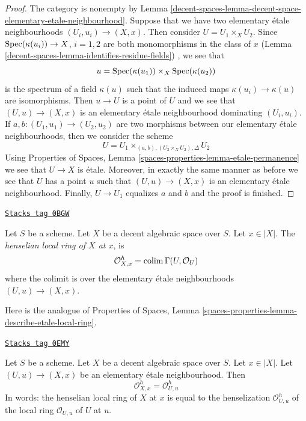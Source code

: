 \begin{proof}
The category is nonempty by
Lemma \ref{decent-spaces-lemma-decent-space-elementary-etale-neighbourhood}.
Suppose that we have two elementary \'etale neighbourhoods
$(U_i, u_i) \to (X, x)$.
Then consider $U = U_1 \times_X U_2$. Since
$\operatorname{Spec}(\kappa(u_i)) \to X$, $i = 1, 2$ are both monomorphisms
in the class of $x$ (Lemma \ref{decent-spaces-lemma-identifies-residue-fields})
, we see that
$$
u = \operatorname{Spec}(\kappa(u_1)) \times_X \operatorname{Spec}(\kappa(u_2))
$$
is the spectrum of a field $\kappa(u)$ such that the induced maps
$\kappa(u_i) \to \kappa(u)$ are isomorphisms. Then $u \to U$ is a point
of $U$ and we see that $(U, u) \to (X, x)$ is an elementary
\'etale neighbourhood dominating $(U_i, u_i)$.
If $a, b : (U_1, u_1) \to (U_2, u_2)$ are two morphisms between
our elementary \'etale neighbourhoods, then we consider the scheme
$$
U = U_1 \times_{(a, b), (U_2 \times_X U_2), \Delta} U_2
$$
Using Properties of Spaces, Lemma
\ref{spaces-properties-lemma-etale-permanence}
we see that $U \to X$ is \'etale. Moreover, in exactly the same manner
as before we see that $U$ has a point $u$
such that $(U, u) \to (X, x)$ is an elementary
\'etale neighbourhood. Finally, $U \to U_1$ equalizes $a$ and $b$
and the proof is finished.
\end{proof}

\begin{definition}
\label{decent-spaces-definition-henselian-local-ring}
\href{https://stacks.math.columbia.edu/tag/0BGW}{\texttt{Stacks tag 0BGW}}

Let $S$ be a scheme. Let $X$ be a decent algebraic space over $S$.
Let $x \in |X|$. The {\it henselian local ring of $X$ at $x$}, is
$$
\mathcal{O}_{X, x}^h = \operatorname{colim} \Gamma(U, \mathcal{O}_U)
$$
where the colimit is over the elementary \'etale neighbourhoods
$(U, u) \to (X, x)$.
\end{definition}

Here is the analogue of
Properties of Spaces, Lemma
\ref{spaces-properties-lemma-describe-etale-local-ring}.

\begin{lemma}
\label{decent-spaces-lemma-describe-henselian-local-ring}
\href{https://stacks.math.columbia.edu/tag/0EMY}{\texttt{Stacks tag 0EMY}}

Let $S$ be a scheme. Let $X$ be a decent algebraic space over $S$.
Let $x \in |X|$. Let $(U, u) \to (X, x)$ be an elementary
\'etale neighbourhood. Then
$$
\mathcal{O}_{X, x}^h = \mathcal{O}_{U, u}^h
$$
In words: the henselian local ring of $X$ at $x$
is equal to the henselization $\mathcal{O}_{U, u}^h$
of the local ring $\mathcal{O}_{U, u}$ of $U$ at $u$.
\end{lemma}

